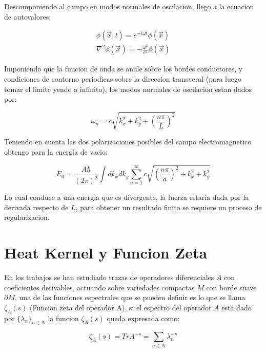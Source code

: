 Descomponiendo al campo en modos normales de oscilacion, llego a la ecuacion de autovalores:

\begin{equation}
\begin{array}{c}
\phi ( \vec{x},t) = e ^{-i \omega t} \phi ( \vec{x}) \\
\nabla ^2 \phi ( \vec{x}) = - \frac{\omega ^2}{c ^2} \phi ( \vec{x})
\end{array}
\end{equation}

Imponiendo que la funcion de onda se anule sobre los bordes conductores, y condiciones de contorno periodicas sobre la direccion transveral (para luego tomar el limite yendo a infinito), los modos normales de oscilacion estan dados por:

\begin{equation}
\omega _n = c \sqrt{ k _x ^2 + k _y ^2 + \left( \frac{n \pi}{L} \right) ^2 }
\end{equation}

Teniendo en cuenta las dos polarizaciones posibles del campo electromagnetico obtengo para la energía de vacio:

\begin{equation}
E _0 = \frac{A \hbar }{(2 \pi) ^2} \int dk _x dk _y 
\sum _{n=1} ^{\infty} 
c
\sqrt{
		\left( \frac{n \pi}{a } \right) ^2 + k _x ^2 + k _y ^2
		}
\end{equation}


Lo cual conduce a una energía que es divergente, la fuerza estaría dada por la derivada respecto de $L$, para obtener un resultado finito se requiere un proceso de regularizacion.

\section{Heat Kernel y Funcion Zeta}


En los trabajos \cite{ Seeley:1967ea,10.2307/2373309,10.2307/2373312} se han estudiado trazas de operadores diferenciales $A$ con coeficientes derivables, actuando sobre variedades compactas $M$ con borde suave $\partial M$, una de las funciones espectrales que se pueden definir es lo que se llama $\zeta _A (s)$ (Funcion zeta del operador A), si el espectro del operador $A$ está dado por $ \{ \lambda _n \} _{n \in N}$ la funcion $\zeta _A (s)$ queda expresada como:


\begin{equation}
\zeta _A (s) = Tr A ^{-s} = \sum _{n \in N}  \lambda _n ^{-s}
\label{funcion.zeta}
\end{equation}

